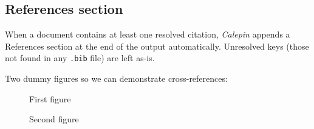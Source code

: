 \subsection*{References section}
\label{references-section}

When a document contains at least one resolved citation, \emph{Calepin} appends a References section at the end of the output automatically. Unresolved keys (those not found in any \texttt{.bib} file) are left as-is.

Two dummy figures so we can demonstrate cross-references:



\begin{figure}
\centering
{}


\caption{First figure}
\label{fig-one}
\end{figure}

\begin{figure}
\centering
{}


\caption{Second figure}
\label{fig-two}
\end{figure}